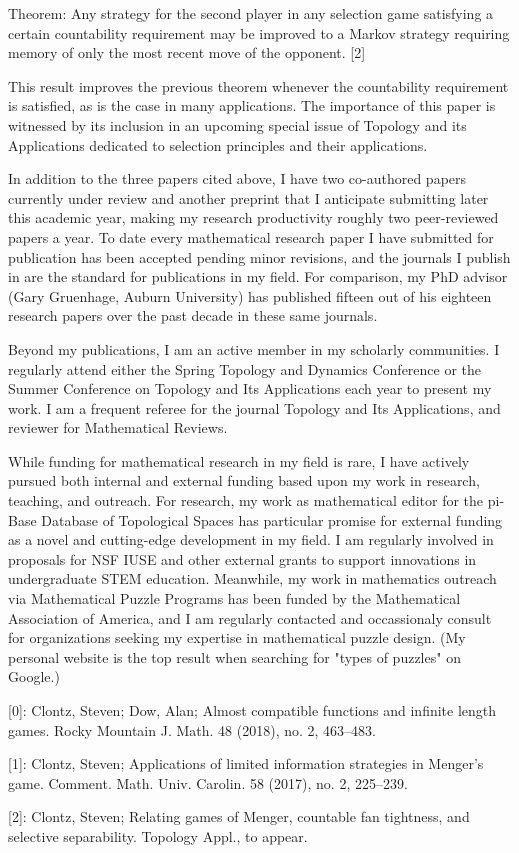 \documentclass[11pt]{amsart}
\theoremstyle{plain}
\newcommand{\<}{\langle}
\renewcommand{\>}{\rangle}
\begin{document}
Theorem: Any strategy for the second player in any selection game satisfying a
certain countability requirement may be improved to a Markov strategy requiring
memory of only the most recent move of the opponent. [2] 

This result improves the previous theorem whenever the countability requirement
is satisfied, as is the case in many applications. The importance of this
paper is witnessed by its inclusion in an upcoming special issue of Topology
and its Applications dedicated to selection principles and their applications.

In addition to the three papers cited above, I have two co-authored papers
currently under review and another preprint that I anticipate submitting later
this academic year, 
making my research productivity roughly two peer-reviewed papers a year. 
To date every mathematical research paper I have submitted for publication has been accepted
pending minor revisions, and the journals I publish in are the standard for publications
in my field. For comparison, my PhD advisor (Gary Gruenhage, Auburn University)
has published fifteen out of his eighteen research papers over the past decade
in these same journals. 

Beyond my publications, I am an active member in my scholarly communities.
I regularly attend either the Spring Topology and Dynamics Conference or
the Summer Conference on Topology and Its Applications each year to present
my work. I am a frequent referee for the journal Topology and Its Applications,
and reviewer for Mathematical Reviews.

While funding for mathematical research in my field is rare, I have actively
pursued both internal and external funding based upon my work in research,
teaching, and outreach. For research, my work as mathematical editor
for the pi-Base Database of Topological Spaces has particular promise for
external funding as a novel and cutting-edge development in my field.
I am regularly involved in proposals for NSF IUSE and other
external grants to support innovations
in undergraduate STEM education. Meanwhile, my work in mathematics outreach
via Mathematical Puzzle Programs has been funded by the Mathematical
Association of America, and I am regularly contacted and occassionaly consult
for organizations seeking my expertise in mathematical 
puzzle design. (My personal website
is the top result when searching for "types of puzzles" on Google.)

[0]: Clontz, Steven; Dow, Alan;
Almost compatible functions and infinite length games.
Rocky Mountain J. Math. 48 (2018), no. 2, 463–483.   

[1]: Clontz, Steven;
Applications of limited information strategies in Menger's game. 
Comment. Math. Univ. Carolin. 58 (2017), no. 2, 225–239. 

[2]: Clontz, Steven;
Relating games of Menger, countable fan tightness, and selective separability.
Topology Appl., to appear.

%
%
\end{document}
